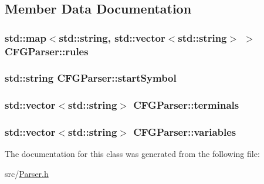 \subsection{Member Data Documentation}
\hypertarget{classCFGParser_a9bea0a4314c8f16ac9aaf0a801a42d86}{
\subsubsection[{rules}]{\setlength{\rightskip}{0pt plus 5cm}std\-::map$<$std\-::string, std\-::vector$<$std\-::string$>$ $>$ C\-F\-G\-Parser\-::rules\hspace{0.3cm}{\ttfamily [private]}}}\label{classCFGParser_a9bea0a4314c8f16ac9aaf0a801a42d86}
\hypertarget{classCFGParser_a3a51f2f7a2f5342ce9016d226869a516}{
\subsubsection[{start\-Symbol}]{\setlength{\rightskip}{0pt plus 5cm}std\-::string C\-F\-G\-Parser\-::start\-Symbol\hspace{0.3cm}{\ttfamily [private]}}}\label{classCFGParser_a3a51f2f7a2f5342ce9016d226869a516}
\hypertarget{classCFGParser_a7242b5a22e08de31297dc9bbb367f5bc}{
\subsubsection[{terminals}]{\setlength{\rightskip}{0pt plus 5cm}std\-::vector$<$std\-::string$>$ C\-F\-G\-Parser\-::terminals\hspace{0.3cm}{\ttfamily [private]}}}\label{classCFGParser_a7242b5a22e08de31297dc9bbb367f5bc}
\hypertarget{classCFGParser_a2be700c7eebe5a1a0fd18b88b3074840}{
\subsubsection[{variables}]{\setlength{\rightskip}{0pt plus 5cm}std\-::vector$<$std\-::string$>$ C\-F\-G\-Parser\-::variables\hspace{0.3cm}{\ttfamily [private]}}}\label{classCFGParser_a2be700c7eebe5a1a0fd18b88b3074840}


The documentation for this class was generated from the following file\-:\begin{DoxyCompactItemize}
\item 
src/\hyperlink{Parser_8h}{Parser.\-h}\end{DoxyCompactItemize}
